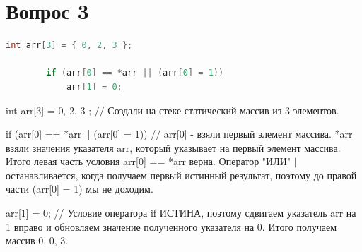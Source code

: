 \documentclass[12pt]{article}
\begin{document}
	\section*{Вопрос 3}
	
	\begin{lstlisting}[language=C++]
		int arr[3] = { 0, 2, 3 };
		
		if (arr[0] == *arr || (arr[0] = 1))
			arr[1] = 0;
	\end{lstlisting}
	
	int arr[3] = { 0, 2, 3 }; // Создали на стеке статический массив из 3 элементов.
	
	if (arr[0] == *arr || (arr[0] = 1)) // arr[0] - взяли первый элемент массива. *arr взяли значения указателя arr, который указывает на первый элемент массива. Итого левая часть условия arr[0] == *arr верна. Оператор "ИЛИ" $||$ останавливается, когда получаем первый истинный результат, поэтому до правой части (arr[0] = 1) мы не доходим.
	
	arr[1] = 0; // Условие оператора if ИСТИНА, поэтому сдвигаем указатель arr на 1 вправо и обновляем значение полученного указателя на 0. Итого получаем массив { 0, 0, 3}.
\end{document}
